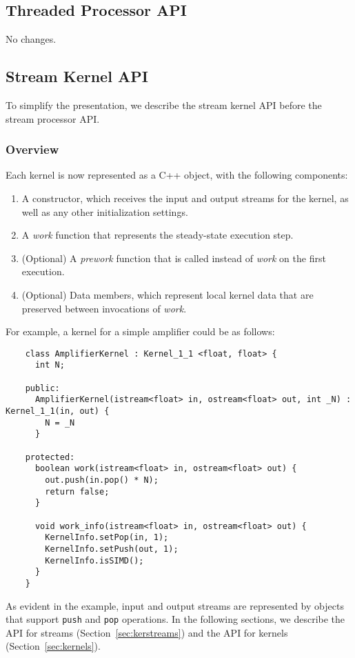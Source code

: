 \subsection{Threaded Processor API}

No changes.

\subsection{Stream Kernel API}

To simplify the presentation, we describe the stream kernel API before
the stream processor API.

\subsubsection{Overview}

Each kernel is now represented as a C++ object, with the following
components:

\begin{enumerate}

\item A constructor, which receives the input and output streams for
the kernel, as well as any other initialization settings.

\item A {\it work} function that represents the steady-state
execution step.

\item (Optional) A {\it prework} function that is called instead of
{\it work} on the first execution.

\item (Optional) Data members, which represent local kernel data that
are preserved between invocations of {\it work}.

\end{enumerate}

For example, a kernel for a simple amplifier could be as follows:
{\small
\begin{verbatim}
    class AmplifierKernel : Kernel_1_1 <float, float> {
      int N;

    public:
      AmplifierKernel(istream<float> in, ostream<float> out, int _N) : Kernel_1_1(in, out) {
        N = _N
      }

    protected:
      boolean work(istream<float> in, ostream<float> out) {
        out.push(in.pop() * N);
        return false;
      }

      void work_info(istream<float> in, ostream<float> out) {
        KernelInfo.setPop(in, 1);
        KernelInfo.setPush(out, 1);
        KernelInfo.isSIMD();
      }
    }  
\end{verbatim}}
As evident in the example, input and output streams are represented by
objects that support {\tt push} and {\tt pop} operations.  In the
following sections, we describe the API for streams
(Section~\ref{sec:kerstreams}) and the API for kernels
(Section~\ref{sec:kernels}).

